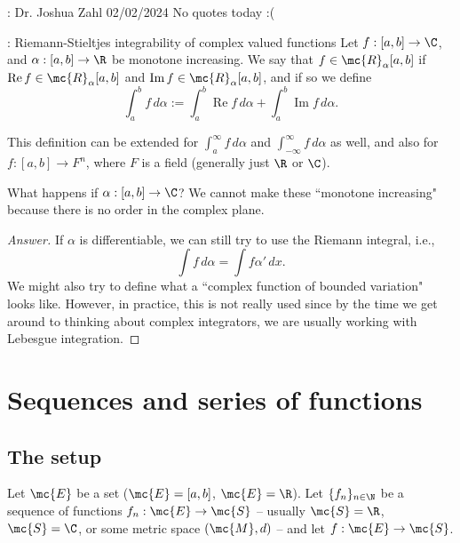 \begin{nquote}{: Dr. Joshua Zahl 02/02/2024}
	No quotes today :(
\end{nquote}

\begin{ndef}{: Riemann-Stieltjes integrability of complex valued functions}
	Let \(f:[a,b]\to\C\), and \(\alpha:[a,b]\to\R\) be monotone increasing. We say that \(f\in\mc{R}_{\alpha}[a,b]\) if \(\operatorname{Re}f\in\mc{R}_{\alpha}[a,b]\) and \(\operatorname{Im}f\in\mc{R}_{\alpha}[a,b]\), and if so we define
	\begin{equation*}
		\int_a^b f \, d\alpha:=\int_a^b \operatorname{Re}f \, d\alpha+\int_a^b \operatorname{Im}f \, d\alpha.
	\end{equation*}
\end{ndef}
This definition can be extended for \(\int_a^{\infty} f \, d\alpha\) and \(\int_{-\infty}^{\infty} f \, d\alpha\) as well, and also for \(f:[a,b]\to F^n\), where \(F\) is a field (generally just \(\R\) or \(\C\)).

\begin{fft}
	What happens if \(\alpha:[a,b]\to\C\)? We cannot make these ``monotone increasing" because there is no order in the complex plane.
\end{fft}
\begin{proof}[Answer]\let\qed\relax
	If \(\alpha\) is differentiable, we can still try to use the Riemann integral, i.e., 
	\begin{equation*}
		\int f \, d\alpha=\int f\alpha' \, dx.
	\end{equation*}
	We might also try to define what a ``complex function of bounded variation" looks like. However, in practice, this is not really used since by the time we get around to thinking about complex integrators, we are usually working with Lebesgue integration.
\end{proof}

\section{Sequences and series of functions}
\subsection{The setup}
Let \(\mc{E}\) be a set (\(\mc{E}=[a,b]\), \(\mc{E}=\R\)). Let \(\{f_n\}_{n\in\N}\) be a sequence of functions \(f_n:\mc{E}\to\mc{S}\) -- usually \(\mc{S}=\R\), \(\mc{S}=\C\), or some metric space \((\mc{M},d)\) -- and let \(f:\mc{E}\to\mc{S}\). 

